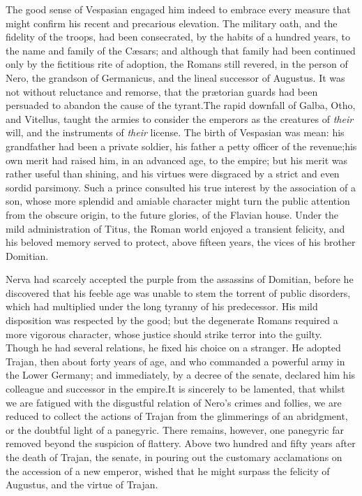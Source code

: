 The good sense of Vespasian engaged him indeed to embrace every
measure that might confirm his recent and precarious elevation.
The military oath, and the fidelity of the troops, had been
consecrated, by the habits of a hundred years, to the name and
family of the Cæsars; and although that family had been continued
only by the fictitious rite of adoption, the Romans still
revered, in the person of Nero, the grandson of Germanicus, and
the lineal successor of Augustus. It was not without reluctance
and remorse, that the prætorian guards had been persuaded to
abandon the cause of the tyrant.\footnotemark[34] The rapid downfall of Galba,
Otho, and Vitellus, taught the armies to consider the emperors as
the creatures of \textit{their} will, and the instruments of \textit{their}
license. The birth of Vespasian was mean: his grandfather had
been a private soldier, his father a petty officer of the
revenue;\footnotemark[35] his own merit had raised him, in an advanced age, to
the empire; but his merit was rather useful than shining, and his
virtues were disgraced by a strict and even sordid parsimony.
Such a prince consulted his true interest by the association of a
son, whose more splendid and amiable character might turn the
public attention from the obscure origin, to the future glories,
of the Flavian house. Under the mild administration of Titus, the
Roman world enjoyed a transient felicity, and his beloved memory
served to protect, above fifteen years, the vices of his brother
Domitian.



Nerva had scarcely accepted the purple from the assassins of
Domitian, before he discovered that his feeble age was unable to
stem the torrent of public disorders, which had multiplied under
the long tyranny of his predecessor. His mild disposition was
respected by the good; but the degenerate Romans required a more
vigorous character, whose justice should strike terror into the
guilty. Though he had several relations, he fixed his choice on a
stranger. He adopted Trajan, then about forty years of age, and
who commanded a powerful army in the Lower Germany; and
immediately, by a decree of the senate, declared him his
colleague and successor in the empire.\footnotemark[36] It is sincerely to be
lamented, that whilst we are fatigued with the disgustful
relation of Nero’s crimes and follies, we are reduced to collect
the actions of Trajan from the glimmerings of an abridgment, or
the doubtful light of a panegyric. There remains, however, one
panegyric far removed beyond the suspicion of flattery. Above two
hundred and fifty years after the death of Trajan, the senate, in
pouring out the customary acclamations on the accession of a new
emperor, wished that he might surpass the felicity of Augustus,
and the virtue of Trajan.\footnotemark[37]

